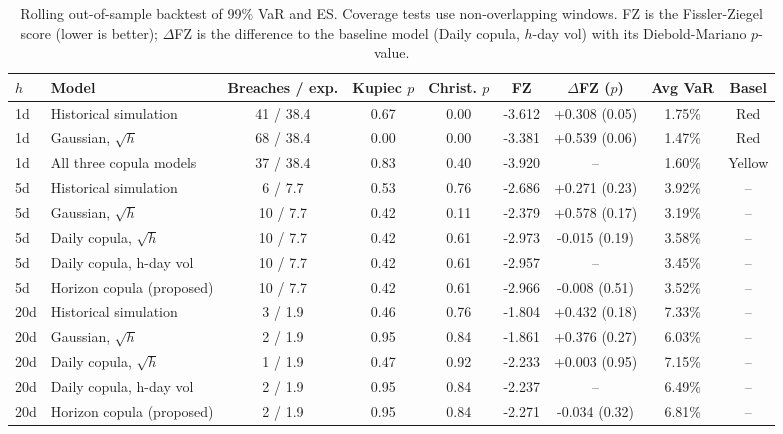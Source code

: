 \begin{table}[H]
\centering
\footnotesize
\setlength{\tabcolsep}{3.5pt}
\begin{tabular}{|l|l|c|c|c|c|c|c|c|}
\hline
\textbf{$h$} & \textbf{Model} & \textbf{Breaches / exp.} & \textbf{Kupiec $p$} & \textbf{Christ. $p$} & \textbf{FZ} & \textbf{$\Delta$FZ ($p$)} & \textbf{Avg VaR} & \textbf{Basel} \\
\hline
1d & Historical simulation & 41 / 38.4 & 0.67 & 0.00 & -3.612 & +0.308 (0.05) & 1.75\% & Red \\
1d & Gaussian, $\sqrt{h}$ & 68 / 38.4 & 0.00 & 0.00 & -3.381 & +0.539 (0.06) & 1.47\% & Red \\
1d & All three copula models & 37 / 38.4 & 0.83 & 0.40 & -3.920 & -- & 1.60\% & Yellow \\
\hline
5d & Historical simulation & 6 / 7.7 & 0.53 & 0.76 & -2.686 & +0.271 (0.23) & 3.92\% & -- \\
5d & Gaussian, $\sqrt{h}$ & 10 / 7.7 & 0.42 & 0.11 & -2.379 & +0.578 (0.17) & 3.19\% & -- \\
5d & Daily copula, $\sqrt{h}$ & 10 / 7.7 & 0.42 & 0.61 & -2.973 & -0.015 (0.19) & 3.58\% & -- \\
5d & Daily copula, h-day vol & 10 / 7.7 & 0.42 & 0.61 & -2.957 & -- & 3.45\% & -- \\
5d & Horizon copula (proposed) & 10 / 7.7 & 0.42 & 0.61 & -2.966 & -0.008 (0.51) & 3.52\% & -- \\
\hline
20d & Historical simulation & 3 / 1.9 & 0.46 & 0.76 & -1.804 & +0.432 (0.18) & 7.33\% & -- \\
20d & Gaussian, $\sqrt{h}$ & 2 / 1.9 & 0.95 & 0.84 & -1.861 & +0.376 (0.27) & 6.03\% & -- \\
20d & Daily copula, $\sqrt{h}$ & 1 / 1.9 & 0.47 & 0.92 & -2.233 & +0.003 (0.95) & 7.15\% & -- \\
20d & Daily copula, h-day vol & 2 / 1.9 & 0.95 & 0.84 & -2.237 & -- & 6.49\% & -- \\
20d & Horizon copula (proposed) & 2 / 1.9 & 0.95 & 0.84 & -2.271 & -0.034 (0.32) & 6.81\% & -- \\
\hline
\end{tabular}
\caption{Rolling out-of-sample backtest of 99\% VaR and ES. Coverage tests use non-overlapping windows. FZ is the Fissler-Ziegel score (lower is better); $\Delta$FZ is the difference to the baseline model (Daily copula, $h$-day vol) with its Diebold-Mariano $p$-value.}
\label{tab:backtest}
\end{table}
